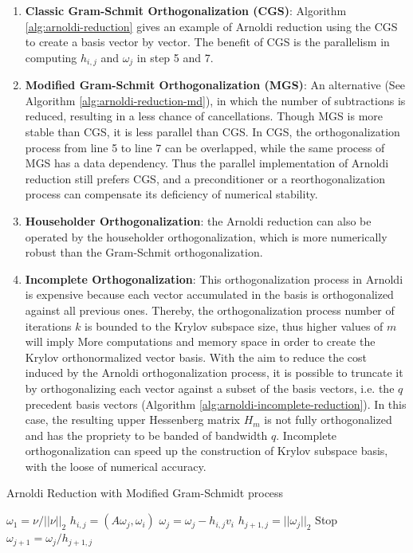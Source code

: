 \begin{enumerate}
	\item \textbf{Classic Gram-Schmit Orthogonalization (CGS)}: Algorithm \ref{alg:arnoldi-reduction} gives an example of Arnoldi reduction using the CGS to create a basis vector by vector. The benefit of CGS is the parallelism in computing $h_{i,j}$ and $\omega_j$ in step 5 and 7.
	\item \textbf{Modified Gram-Schmit Orthogonalization (MGS)}: An alternative (See Algorithm \ref{alg:arnoldi-reduction-md}), in which the number of subtractions is reduced, resulting in a less chance of cancellations. Though MGS is more stable than CGS, it is less parallel than CGS. In CGS, the orthogonalization process from line 5 to line 7 can be overlapped, while the same process of MGS has a data dependency. Thus the parallel implementation of Arnoldi reduction still prefers CGS, and a preconditioner or a reorthogonalization process can compensate its deficiency of numerical stability.
	\item \textbf{Householder Orthogonalization}: the  Arnoldi reduction can also be operated by the householder orthogonalization, which is more numerically robust than the Gram-Schmit orthogonalization.
	\item \textbf{Incomplete Orthogonalization}: This orthogonalization process in Arnoldi is expensive because each vector accumulated in the basis is orthogonalized against all previous ones. Thereby, the orthogonalization process number of iterations $k$ is bounded to the Krylov subspace size, thus higher values of $m$ will imply More computations and memory space in order to create the Krylov orthonormalized vector basis. With the aim to reduce the cost induced by the Arnoldi orthogonalization process, it is possible to truncate it by orthogonalizing each vector against a subset of the basis vectors, i.e. the $q$ precedent basis vectors (Algorithm \ref{alg:arnoldi-incomplete-reduction}). In this case, the resulting upper Hessenberg matrix $H_m$ is not fully orthogonalized and has the propriety to be banded of bandwidth $q$. Incomplete orthogonalization can speed up the construction of Krylov subspace basis, with the loose of numerical accuracy.
\end{enumerate}

\begin{algorithm}[t]{}
	\caption{Arnoldi Reduction with Modified Gram-Schmidt process}   
	\label{alg:arnoldi-reduction-md}   
	\begin{algorithmic}[1]
		\State $\omega_1=\nu /||\nu||_2$
		\State $h_{i,j}=(A\omega_j,\omega_i)$
		\State $\omega_j=\omega_j-h_{i,j}v_i$
		\EndFor
		\State $h_{j+1,j}=||\omega_j||_2$
		 Stop
		\EndIf
		\State $\omega_{j+1}=\omega_j/h_{j+1,j}$
		\EndFor 
		\EndFunction
	\end{algorithmic}  
\end{algorithm}

